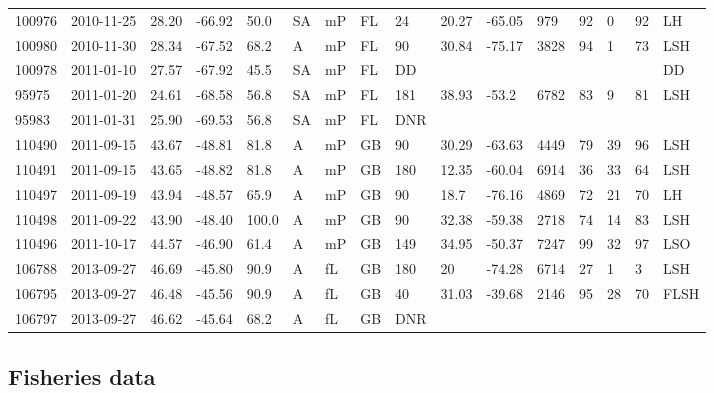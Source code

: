 \begin{landscape}
\begin{table}
{\begin{tabular}{p{1cm} p{2cm} p{1cm} p{1cm} p{1cm} p{0.85cm} p{0.75cm} p{0.85cm} p{1cm} p{1cm} p{1cm} p{1cm} p{1cm} p{1cm} p{1cm} p{1cm}}
100976 & 2010-11-25 & 28.20 & -66.92 & 50.0 & SA & mP & FL & 24 & 20.27 & -65.05 & 979 & 92 & 0 & 92 & LH\\
100980 & 2010-11-30 & 28.34 & -67.52 & 68.2 & A & mP & FL & 90 & 30.84 & -75.17 & 3828 & 94 & 1 & 73 & LSH\\
100978 & 2011-01-10 & 27.57 & -67.92 & 45.5 & SA & mP & FL & DD &  &  &  &  &  &  & DD\\
95975 & 2011-01-20 & 24.61 & -68.58 & 56.8 & SA & mP & FL & 181 & 38.93 & -53.2 & 6782 & 83 & 9 & 81 & LSH\\
95983 & 2011-01-31 & 25.90 & -69.53 & 56.8 & SA & mP & FL & DNR &  &  &  &  &  &  & \\
110490 & 2011-09-15 & 43.67 & -48.81 & 81.8 & A & mP & GB & 90 & 30.29 & -63.63 & 4449 & 79 & 39 & 96 & LSH\\
110491 & 2011-09-15 & 43.65 & -48.82 & 81.8 & A & mP & GB & 180 & 12.35 & -60.04 & 6914 & 36 & 33 & 64 & LSH\\
110497 & 2011-09-19 & 43.94 & -48.57 & 65.9 & A & mP & GB & 90 & 18.7 & -76.16 & 4869 & 72 & 21 & 70 & LH\\
110498 & 2011-09-22 & 43.90 & -48.40 & 100.0 & A & mP & GB & 90 & 32.38 & -59.38 & 2718 & 74 & 14 & 83 & LSH\\
110496 & 2011-10-17 & 44.57 & -46.90 & 61.4 & A & mP & GB & 149 & 34.95 & -50.37 & 7247 & 99 & 32 & 97 & LSO\\
106788 & 2013-09-27 & 46.69 & -45.80 & 90.9 & A & fL & GB & 180 & 20 & -74.28 & 6714 & 27 & 1 & 3 & LSH\\
106795 & 2013-09-27 & 46.48 & -45.56 & 90.9 & A & fL & GB & 40 & 31.03 & -39.68 & 2146 & 95 & 28 & 70 & FLSH\\
106797 & 2013-09-27 & 46.62 & -45.64 & 68.2 & A & fL & GB & DNR &  &  &  &  &  &  & \\
\bottomrule
\end{tabular}}
\end{table}
\end{landscape}
\clearpage

\subsection{Fisheries data}%

